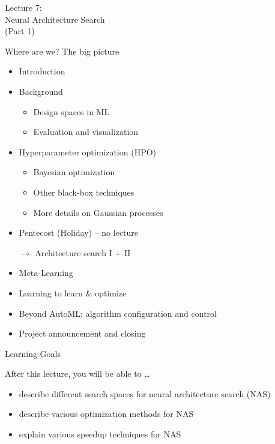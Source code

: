 \newcommand{\algorithmicinput}{\textbf{Input}}
\newcommand{\INPUT}{\item[\algorithmicinput]}
\newcommand{\algorithmicoutput}{\textbf{Output}}
\newcommand{\OUTPUT}{\item[\algorithmicoutput]}

\begin{frame}[c]{}

\centering
\huge
Lecture 7:\\
Neural Architecture Search\\
	(Part 1)
\end{frame}
\begin{frame}[c]{Where are we? The big picture}

\begin{itemize}
	\item Introduction
	\item Background
	\begin{itemize}
		\item Design spaces in ML
		\item Evaluation and visualization
	\end{itemize}
	\item Hyperparameter optimization (HPO)
	\begin{itemize}
		\item Bayesian optimization
		\item Other black-box techniques
		\item More details on Gaussian processes
	\end{itemize}
	\item Pentecost (Holiday) -- no lecture
	\item[$\to$]  Architecture search I + II
	\item Meta-Learning
	\item Learning to learn $\&$ optimize
	\item Beyond AutoML: algorithm configuration and control
	\item Project announcement and closing
\end{itemize}

\end{frame}

\begin{frame}[c]{Learning Goals}

After this lecture, you will be able to \ldots

\begin{itemize}
	\item describe different \alert{search spaces} for neural architecture search (NAS)
	\item describe various \alert{optimization methods for NAS}
	\item explain various \alert{speedup techniques for NAS}
\end{itemize}


\end{frame}
